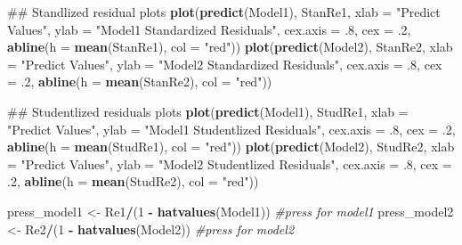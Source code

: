 \documentclass[]{article}
\newenvironment{Shaded}{\begin{snugshade}}{\end{snugshade}}
\newcommand{\KeywordTok}[1]{\textcolor[rgb]{0.13,0.29,0.53}{\textbf{#1}}}
\newcommand{\DataTypeTok}[1]{\textcolor[rgb]{0.13,0.29,0.53}{#1}}
\newcommand{\DecValTok}[1]{\textcolor[rgb]{0.00,0.00,0.81}{#1}}
\newcommand{\StringTok}[1]{\textcolor[rgb]{0.31,0.60,0.02}{#1}}
\newcommand{\CommentTok}[1]{\textcolor[rgb]{0.56,0.35,0.01}{\textit{#1}}}
\newcommand{\OperatorTok}[1]{\textcolor[rgb]{0.81,0.36,0.00}{\textbf{#1}}}
\newcommand{\NormalTok}[1]{#1}
\begin{document}
\begin{Shaded}
\begin{Highlighting}[]
\NormalTok{## Standlized residual plots}
\KeywordTok{plot}\NormalTok{(}\KeywordTok{predict}\NormalTok{(Model1), StanRe1, }\DataTypeTok{xlab =} \StringTok{"Predict Values"}\NormalTok{, }
     \DataTypeTok{ylab =} \StringTok{"Model1 Standardized Residuals"}\NormalTok{, }\DataTypeTok{cex.axis =}\NormalTok{ .}\DecValTok{8}\NormalTok{, }
     \DataTypeTok{cex =}\NormalTok{ .}\DecValTok{2}\NormalTok{, }\KeywordTok{abline}\NormalTok{(}\DataTypeTok{h =} \KeywordTok{mean}\NormalTok{(StanRe1), }\DataTypeTok{col =} \StringTok{"red"}\NormalTok{))}
\KeywordTok{plot}\NormalTok{(}\KeywordTok{predict}\NormalTok{(Model2), StanRe2, }\DataTypeTok{xlab =} \StringTok{"Predict Values"}\NormalTok{, }
     \DataTypeTok{ylab =} \StringTok{"Model2 Standardized Residuals"}\NormalTok{, }\DataTypeTok{cex.axis =}\NormalTok{ .}\DecValTok{8}\NormalTok{,}
     \DataTypeTok{cex =}\NormalTok{ .}\DecValTok{2}\NormalTok{, }\KeywordTok{abline}\NormalTok{(}\DataTypeTok{h =} \KeywordTok{mean}\NormalTok{(StanRe2), }\DataTypeTok{col =} \StringTok{"red"}\NormalTok{))}

\NormalTok{## Studentlized residuals plots}
\KeywordTok{plot}\NormalTok{(}\KeywordTok{predict}\NormalTok{(Model1), StudRe1, }\DataTypeTok{xlab =} \StringTok{"Predict Values"}\NormalTok{,}
     \DataTypeTok{ylab =} \StringTok{"Model1 Studentlized Residuals"}\NormalTok{, }\DataTypeTok{cex.axis =}\NormalTok{ .}\DecValTok{8}\NormalTok{,}
     \DataTypeTok{cex =}\NormalTok{ .}\DecValTok{2}\NormalTok{, }\KeywordTok{abline}\NormalTok{(}\DataTypeTok{h =} \KeywordTok{mean}\NormalTok{(StudRe1), }\DataTypeTok{col =} \StringTok{"red"}\NormalTok{))}
\KeywordTok{plot}\NormalTok{(}\KeywordTok{predict}\NormalTok{(Model2), StudRe2, }\DataTypeTok{xlab =} \StringTok{"Predict Values"}\NormalTok{,}
     \DataTypeTok{ylab =} \StringTok{"Model2 Studentlized Residuals"}\NormalTok{, }\DataTypeTok{cex.axis =}\NormalTok{ .}\DecValTok{8}\NormalTok{, }
     \DataTypeTok{cex =}\NormalTok{ .}\DecValTok{2}\NormalTok{, }\KeywordTok{abline}\NormalTok{(}\DataTypeTok{h =} \KeywordTok{mean}\NormalTok{(StudRe2), }\DataTypeTok{col =} \StringTok{"red"}\NormalTok{))}

\NormalTok{press_model1 <-}\StringTok{ }\NormalTok{Re1}\OperatorTok{/}\NormalTok{(}\DecValTok{1} \OperatorTok{-}\StringTok{ }\KeywordTok{hatvalues}\NormalTok{(Model1)) }\CommentTok{#press for model1 }
\NormalTok{press_model2 <-}\StringTok{ }\NormalTok{Re2}\OperatorTok{/}\NormalTok{(}\DecValTok{1} \OperatorTok{-}\StringTok{ }\KeywordTok{hatvalues}\NormalTok{(Model2)) }\CommentTok{#press for model2}


\end{Highlighting}
\end{Shaded}
\end{document}
